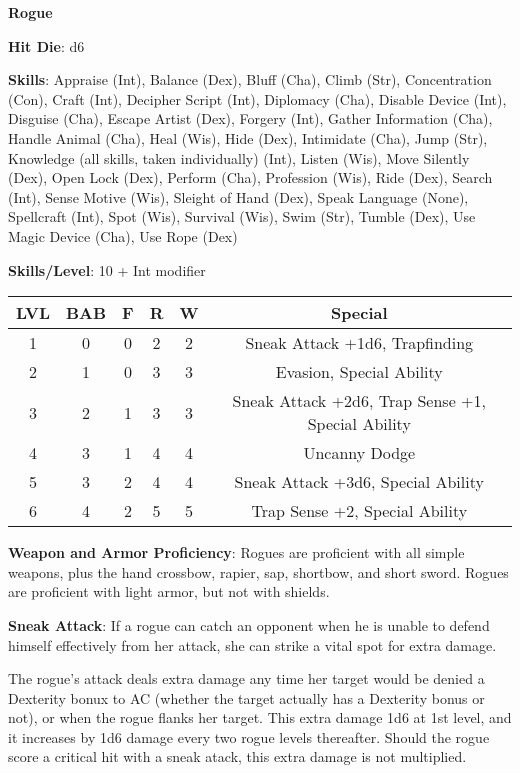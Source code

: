 \textbf{\huge{Rogue}}

\textbf{Hit Die}: d6

\textbf{Skills}: Appraise (Int), Balance (Dex), Bluff (Cha), Climb (Str), Concentration (Con), Craft (Int), Decipher Script (Int), Diplomacy (Cha), Disable Device (Int), Disguise (Cha), Escape Artist (Dex), Forgery (Int), Gather Information (Cha), Handle Animal (Cha), Heal (Wis), Hide (Dex), Intimidate (Cha), Jump (Str), Knowledge (all skills, taken individually) (Int), Listen (Wis), Move Silently (Dex), Open Lock (Dex), Perform (Cha), Profession (Wis), Ride (Dex), Search (Int), Sense Motive (Wis), Sleight of Hand (Dex), Speak Language (None), Spellcraft (Int), Spot (Wis), Survival (Wis), Swim (Str), Tumble (Dex), Use Magic Device (Cha), Use Rope (Dex)

\textbf{Skills/Level}: 10 + Int modifier

\begin{center}
\begin{adjustwidth}{-4cm}{}
\begin{small}
\begin{tabular}{| c | c | c | c | c | c |}
\hline
LVL &BAB &F &R &W &Special \\
\hline
1 &0 &0 &2 &2 &Sneak Attack +1d6, Trapfinding \\
2 &1 &0 &3 &3 &Evasion, Special Ability \\
3 &2 &1 &3 &3 &Sneak Attack +2d6, Trap Sense +1, Special Ability \\
4 &3 &1 &4 &4 &Uncanny Dodge \\
5 &3 &2 &4 &4 &Sneak Attack +3d6, Special Ability \\
6 &4 &2 &5 &5 &Trap Sense +2, Special Ability \\
\hline
\end{tabular}
\end{small}
\end{adjustwidth}
\end{center}

\textbf{Weapon and Armor Proficiency}: Rogues are proficient with all simple weapons, plus the hand crossbow, rapier, sap, shortbow, and short sword. Rogues are proficient with light armor, but not with shields.

\textbf{Sneak Attack}: If a rogue can catch an opponent when he is unable to defend himself effectively from her attack, she can strike a vital spot for extra damage. 

The rogue's attack deals extra damage any time her target would be denied a Dexterity bonux to AC (whether the target actually has a Dexterity bonus or not), or when the rogue flanks her target. This extra damage 1d6 at 1st level, and it increases by 1d6 damage every two rogue levels thereafter. Should the rogue score a critical hit with a sneak atack, this extra damage is not multiplied.

